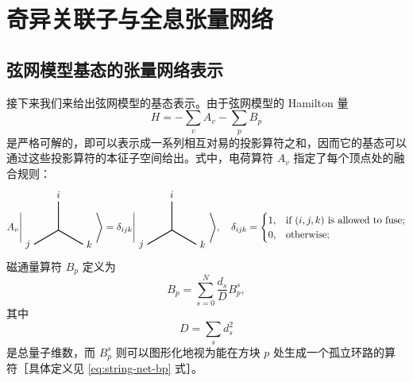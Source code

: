 \chapter{奇异关联子与全息张量网络}
\label{chap:strange-correlator}

\tikzset{x=1em, y=1em, node font=\footnotesize}

\section{弦网模型基态的张量网络表示}

接下来我们来给出弦网模型的基态表示\cite{gu2009tensor2,buerschaper2009explicit}。由于弦网模型的 Hamilton 量
\begin{equation}
  H = -\sum_v A_v - \sum_p B_p
\end{equation}
是严格可解的，即可以表示成一系列相互对易的投影算符之和，因而它的基态可以通过这些投影算符的本征子空间给出。式中，电荷算符 $A_v$ 指定了每个顶点处的融合规则：
\begin{equation}
  A_v \Biggl| \Vertex ijk \Biggr\rangle = \delta_{ijk} \Biggl| \Vertex ijk \Biggr\rangle, \quad
  \delta_{ijk} = \begin{cases}
    1, & \text{if $(i,j,k)$ is allowed to fuse;} \\
    0, & \text{otherwise;}
  \end{cases}
\end{equation}
磁通量算符 $B_p$ 定义为
\begin{equation}
  B_p = \sum_{s=0}^N \frac{d_s}{D} B_p^s,
\end{equation}
其中
\begin{equation}
  D = \sum_s d_s^2
\end{equation}
是总量子维数，而 $B_p^s$ 则可以图形化地视为能在方块 $p$ 处生成一个孤立环路的算符［具体定义见 \eqref{eq:string-net-bp} 式］。

